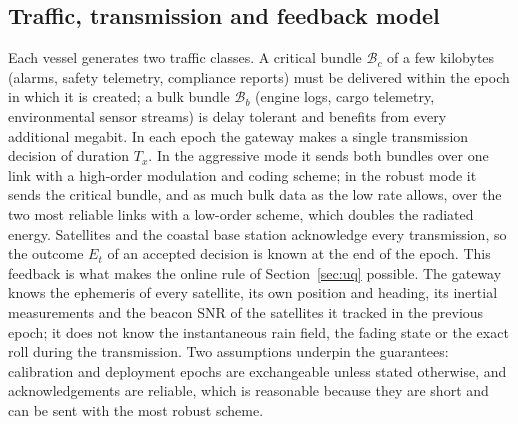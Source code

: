 \subsection{Traffic, transmission and feedback model}
Each vessel generates two traffic classes. A critical bundle $\mathcal B_c$ of a few kilobytes (alarms, safety telemetry, compliance reports) must be delivered within the epoch in which it is created; a bulk bundle $\mathcal B_b$ (engine logs, cargo telemetry, environmental sensor streams) is delay tolerant and benefits from every additional megabit. In each epoch the gateway makes a single transmission decision of duration $T_x$. In the aggressive mode it sends both bundles over one link with a high-order modulation and coding scheme; in the robust mode it sends the critical bundle, and as much bulk data as the low rate allows, over the two most reliable links with a low-order scheme, which doubles the radiated energy. Satellites and the coastal base station acknowledge every transmission, so the outcome $E_t$ of an accepted decision is known at the end of the epoch. This feedback is what makes the online rule of Section~\ref{sec:uq} possible. The gateway knows the ephemeris of every satellite, its own position and heading, its inertial measurements and the beacon SNR of the satellites it tracked in the previous epoch; it does not know the instantaneous rain field, the fading state or the exact roll during the transmission. Two assumptions underpin the guarantees: calibration and deployment epochs are exchangeable unless stated otherwise, and acknowledgements are reliable, which is reasonable because they are short and can be sent with the most robust scheme.

